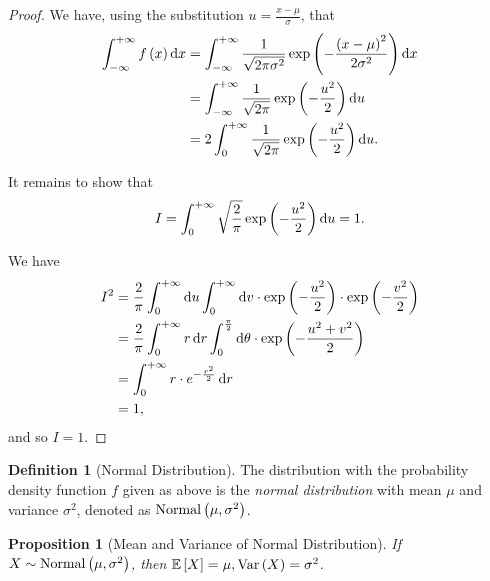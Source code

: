 \documentclass{article}
\newtheorem{proposition}[theorem]{Proposition}
\theoremstyle{definition}
\newtheorem{definition}[theorem]{Definition}
\theoremstyle{remark}
\newcommand{\Expt}{\mathbb{E}}
\newcommand{\plusinfty}{+\infty}
\newcommand{\minusinfty}{-\infty}
\newcommand{\Var}{\operatorname{Var}}
\newcommand{\Normal}{\operatorname{Normal}}
\begin{document}
\begin{proof}
    We have, using the substitution \(u = \frac{x - \mu}{\sigma}\), that
    \begin{align*}
        \int_{\minusinfty}^{\plusinfty} f\pqty{x} \dd{x} &= \int_{\minusinfty}^{\plusinfty} \frac{1}{\sqrt{2 \pi \sigma^2}} \exp\pqty{-\frac{\pqty{x - \mu}^2}{2 \sigma^2}} \dd{x} \\
        &= \int_{\minusinfty}^{\plusinfty} \frac{1}{\sqrt{2 \pi}} \exp\pqty{- \frac{u^2}{2}} \dd{u} \\
        &= 2 \int_{0}^{\plusinfty} \frac{1}{\sqrt{2 \pi}} \exp\pqty{- \frac{u^2}{2}} \dd{u}.
    \end{align*}

    It remains to show that
    \[
        I = \int_{0}^{\plusinfty} \sqrt{\frac{2}{\pi}} \exp\pqty{- \frac{u^2}{2}} \dd{u} = 1.
    \]

    We have
    \begin{align*}
        I^2 &= \frac{2}{\pi} \int_{0}^{\plusinfty} \dd{u} \int_{0}^{\plusinfty} \dd{v} \cdot \exp\pqty{- \frac{u^2}{2}} \cdot \exp\pqty{- \frac{v^2}{2}} \\
        &= \frac{2}{\pi} \int_{0}^{\plusinfty} r \dd{r} \int_{0}^{\frac{\pi}{2}} \dd{\theta} \cdot \exp\pqty{- \frac{u^2 + v^2}{2}} \\
        &= \int_{0}^{\plusinfty} r \cdot e^{-\frac{r^2}{2}} \dd{r} \\
        &= 1,
    \end{align*}
    and so \(I = 1\).
\end{proof}

\begin{definition}[Normal Distribution]
    \label{def:normal}%
    The distribution with the probability density function \(f\) given as above is the \emph{normal distribution} with mean \(\mu\) and variance \(\sigma^2\), denoted as \(\Normal\pqty{\mu, \sigma^2}\).
\end{definition}

\begin{proposition}[Mean and Variance of Normal Distribution]
    \label{prop:mean-variance-normal}%
    If \(X \sim \Normal\pqty{\mu, \sigma^2}\), then \(\Expt\bqty{X} = \mu, \Var\pqty{X} = \sigma^2\).
\end{proposition}
\end{document}
